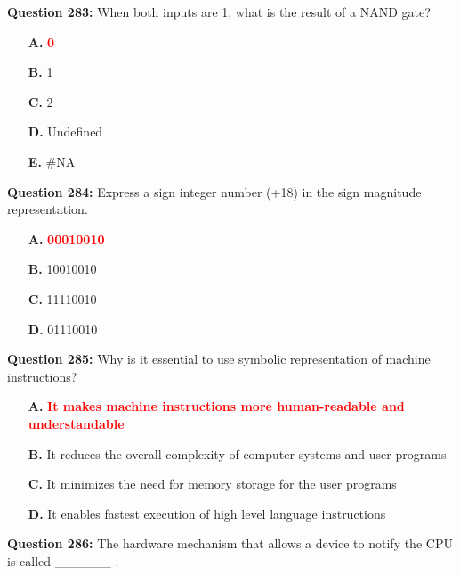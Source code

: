 \documentclass[12pt,a4paper]{article}
\begin{document}
\vspace{0.5cm}

\textbf{Question 283:} When both inputs are 1, what is the result of a NAND gate?

\begin{itemize}
    \item[\textbf{A.}] \textcolor{red}{\textbf{0}}
    \item[\textbf{B.}] 1
    \item[\textbf{C.}] 2
    \item[\textbf{D.}] Undefined
    \item[\textbf{E.}] \#NA
\end{itemize}

\vspace{0.5cm}

\textbf{Question 284:} Express a sign integer number (+18) in the sign magnitude representation.

\begin{itemize}
    \item[\textbf{A.}] \textcolor{red}{\textbf{00010010}}
    \item[\textbf{B.}] 10010010
    \item[\textbf{C.}] 11110010
    \item[\textbf{D.}] 01110010
\end{itemize}

\vspace{0.5cm}

\textbf{Question 285:} Why is it essential to use symbolic representation of machine instructions?

\begin{itemize}
    \item[\textbf{A.}] \textcolor{red}{\textbf{It makes machine instructions more human-readable and understandable}}
    \item[\textbf{B.}] It reduces the overall complexity of computer systems and user programs
    \item[\textbf{C.}] It minimizes the need for memory storage for the user programs
    \item[\textbf{D.}] It enables fastest execution of high level language instructions
\end{itemize}

\vspace{0.5cm}

\textbf{Question 286:} The hardware mechanism that allows a device to notify the CPU is called ______ .
\end{document}
